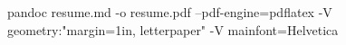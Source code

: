 pandoc resume.md -o resume.pdf --pdf-engine=pdflatex -V geometry:"margin=1in, letterpaper" -V mainfont=Helvetica